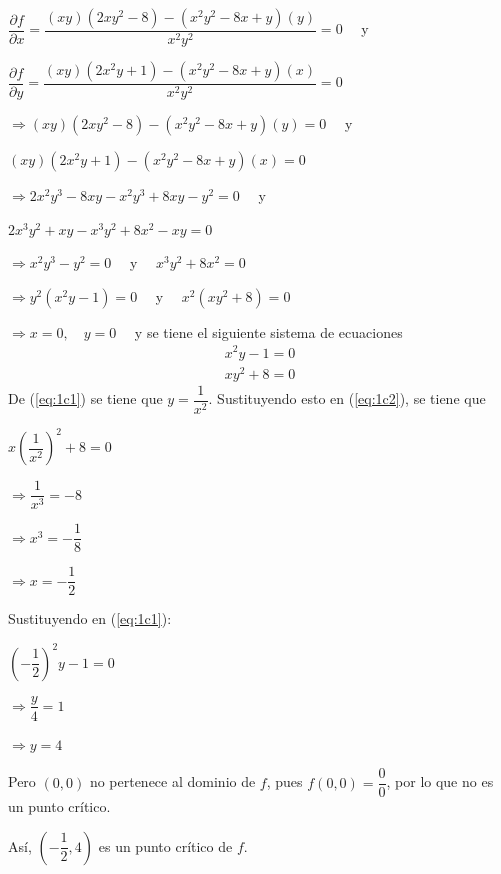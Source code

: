 \documentclass[fleqn, 12pt]{article}
\newcommand{\derivadaparcial}[2]{\dfrac{\partial {#1}}{\partial {#2}}}
\begin{document}
\begin{enumerate}
\begin{enumerate}
            $ \derivadaparcial{f}{x} = \dfrac{(xy)(2x y^2 - 8) - (x^2 y^2 - 8x + y)(y)}{x^2 y^2} = 0 \quad $ y

            $ \derivadaparcial{f}{y} = \dfrac{(xy)(2x^2 y + 1) - (x^2 y^2 - 8x + y)(x)}{x^2 y^2} = 0 $


            $ \Longrightarrow (xy)(2x y^2 - 8) - (x^2 y^2 - 8x + y)(y) = 0 \quad $ y

            \hspace{7mm} $ (xy)(2x^2 y + 1) - (x^2 y^2 - 8x + y)(x) = 0 $


            $ \Longrightarrow 2x^2 y^3 - 8xy - x^2 y^3 + 8xy - y^2 = 0 \quad $ y

            \hspace{7mm} $ 2x^3 y^2 + xy - x^3 y^2 + 8x^2 - xy = 0 $


            $ \Longrightarrow x^2 y^3 - y^2 = 0 \quad $ y $ \quad x^3 y^2 + 8x^2 = 0 $

            $ \Longrightarrow y^2(x^2 y - 1) = 0 \quad $ y $ \quad x^2(xy^2 + 8) = 0 $

            $ \Longrightarrow x = 0, \quad y = 0 \quad $ y se tiene el siguiente sistema de ecuaciones
            \begin{align}
                x^2 y - 1 = 0 \label{eq:1c1} \\
                xy^2 + 8 = 0 \label{eq:1c2}
            \end{align}
            De (\ref{eq:1c1}) se tiene que $ y = \dfrac{1}{x^2} $. Sustituyendo esto en (\ref{eq:1c2}), se tiene que

            $ x \left( \dfrac{1}{x^2} \right)^2 + 8 = 0 $

            $ \Longrightarrow \dfrac{1}{x^3} = -8 $

            $ \Longrightarrow x^3 = -\dfrac{1}{8} $

            $ \Longrightarrow x = -\dfrac{1}{2} $

            Sustituyendo en (\ref{eq:1c1}): 

            $ \left( -\dfrac{1}{2} \right)^2 y - 1 = 0 $

            $ \Longrightarrow \dfrac{y}{4} = 1 $

            $ \Longrightarrow y = 4 $

            Pero $ (0,0) $ no pertenece al dominio de $ f $, pues $ f(0,0) = \dfrac{0}{0} $, por lo que no es un punto crítico.

            Así, $ \left( -\dfrac{1}{2}, 4 \right) $ es un punto crítico de $ f $.


\end{enumerate}
\end{enumerate}
\end{document}
